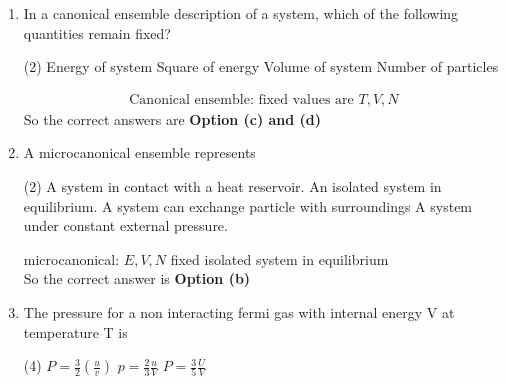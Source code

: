 \begin{enumerate}
\begin{tasks}
		\task[\textbf{c.}]Is a maximum in equilibrium .
		\task[\textbf{d.}] Is a minimum in equilibrium .
	\end{tasks}
	\begin{answer}
		\begin{align*}
		E, U, N \rightarrow& \text{ micro canonical ensemble}\\
		S&=K \ln T(E, V, N)\\
		\text{maximum when }&\text{$\Gamma$ is maximum}\\
		\text{In equilibrium } &s \rightarrow\text{ maximum}\\
		\Rightarrow &r \rightarrow \text { maximum }
		\end{align*}
		So the correct answer is \textbf{Option (c)}
	\end{answer}
	\item In a canonical ensemble description of a system, which of the following quantities remain fixed?
	\begin{tasks}(2)
		\task[\textbf{a.}]Energy of system 
		\task[\textbf{b.}]Square of energy
		\task[\textbf{c.}]Volume of system
		\task[\textbf{d.}] Number of particles
	\end{tasks}
	\begin{answer}
		\begin{align*}
		\text{Canonical ensemble:
			fixed values are }T, V, N
		\end{align*}
		So the correct answers are \textbf{Option (c) and (d)}
	\end{answer}
	\item A microcanonical ensemble represents
	\begin{tasks}(2)
		\task[\textbf{a.}]A system in contact with a heat reservoir.
		\task[\textbf{b.}]An isolated system in equilibrium.
		\task[\textbf{c.}]A system can exchange particle with surroundings
		\task[\textbf{d.}]A system under constant external pressure. 
	\end{tasks}
	\begin{answer}
		microcanonical: $E, V, N$ fixed isolated system in equilibrium\\
		So the correct answer is \textbf{Option (b)}
	\end{answer}
	\item The pressure for a non interacting fermi gas with internal energy V at temperature T is 
	\begin{tasks}(4)
		\task[\textbf{a.}]$P=\frac{3}{2}\left(\frac{u}{v}\right)$
		\task[\textbf{b.}]$p=\frac{2}{3} \frac{u}{V}$
		\task[\textbf{c.}]$ P=\frac{3}{5} \frac{U}{V}$

\end{tasks}
\end{enumerate}
